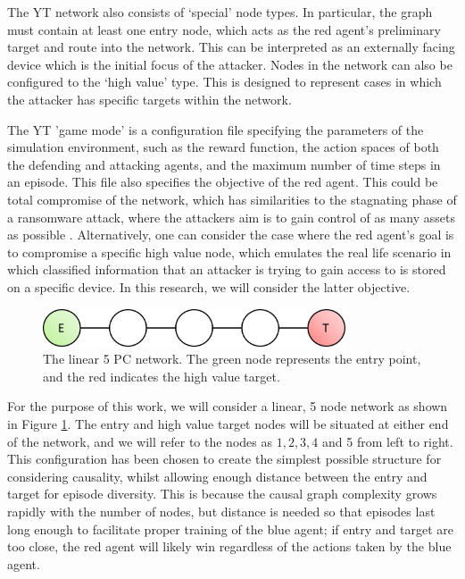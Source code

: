 \documentclass{article}
\begin{document}
The YT network also consists of `special' node types. In particular, the graph must contain at least one entry node, which acts as the red agent's preliminary target and route into the network. This can be interpreted as an externally facing device which is the initial focus of the attacker. Nodes in the network can also be configured to the `high value' type. This is designed to represent cases in which the attacker has specific targets within the network.

The YT 'game mode' is a configuration file specifying the parameters of the simulation environment, such as the reward function, the action spaces of both the defending and attacking agents, and the maximum number of time steps in an episode. This file also specifies the objective of the red agent. This could be total compromise of the network, which has similarities to the stagnating phase of a ransomware attack, where the attackers aim is to gain control of as many assets as possible \cite{collyer2022acd}. Alternatively, one can consider the case where the red agent's goal is to compromise a specific high value node, which emulates the real life scenario in which classified information that an attacker is trying to gain access to is stored on a specific device. In this research, we will consider the latter objective. 

\begin{figure}[htp]
    \centering
    \includegraphics[width=0.8\textwidth]{Images/linear_5_PC.png}
    \caption{The linear 5 PC network. The green node represents the entry point, and the red indicates the high value target.}
    \label{fig:linear_5PC_diagram}
\end{figure}

For the purpose of this work, we will consider a linear, 5 node network as shown in Figure \ref{fig:linear_5PC_diagram}. The entry and high value target nodes will be situated at either end of the network, and we will refer to the nodes as $1,2,3,4$ and 5 from left to right. This configuration has been chosen to create the simplest possible structure for considering causality, whilst allowing enough distance between the entry and target for episode diversity. This is because the causal graph complexity grows rapidly with the number of nodes, but distance is needed so that episodes last long enough to facilitate proper training of the blue agent; if entry and target are too close, the red agent will likely win regardless of the actions taken by the blue agent.
\end{document}
